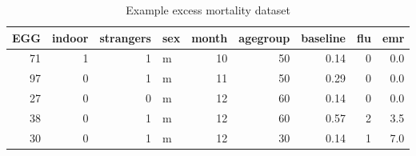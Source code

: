 \begin{table}

\caption{\label{tab:tab:example}Example excess mortality dataset}
\centering
\begin{tabular}[t]{r|r|r|l|r|r|r|r|r}
\hline
EGG & indoor & strangers & sex & month & agegroup & baseline & flu & emr\\
\hline
71 & 1 & 1 & m & 10 & 50 & 0.14 & 0 & 0.0\\
\hline
97 & 0 & 1 & m & 11 & 50 & 0.29 & 0 & 0.0\\
\hline
27 & 0 & 0 & m & 12 & 60 & 0.14 & 0 & 0.0\\
\hline
38 & 0 & 1 & m & 12 & 60 & 0.57 & 2 & 3.5\\
\hline
30 & 0 & 1 & m & 12 & 30 & 0.14 & 1 & 7.0\\
\hline
\end{tabular}
\end{table}
